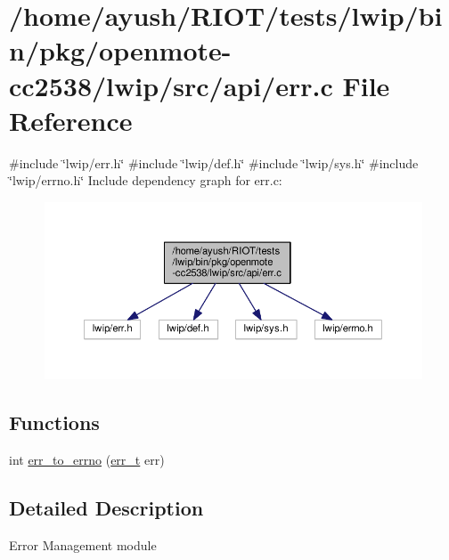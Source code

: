 \hypertarget{openmote-cc2538_2lwip_2src_2api_2err_8c}{}\section{/home/ayush/\+R\+I\+O\+T/tests/lwip/bin/pkg/openmote-\/cc2538/lwip/src/api/err.c File Reference}
\label{openmote-cc2538_2lwip_2src_2api_2err_8c}
{\ttfamily \#include \char`\"{}lwip/err.\+h\char`\"{}}\newline
{\ttfamily \#include \char`\"{}lwip/def.\+h\char`\"{}}\newline
{\ttfamily \#include \char`\"{}lwip/sys.\+h\char`\"{}}\newline
{\ttfamily \#include \char`\"{}lwip/errno.\+h\char`\"{}}\newline
Include dependency graph for err.\+c\+:
\nopagebreak
\begin{figure}[H]
\begin{center}
\leavevmode
\includegraphics[width=350pt]{openmote-cc2538_2lwip_2src_2api_2err_8c__incl}
\end{center}
\end{figure}
\subsection*{Functions}
\begin{DoxyCompactItemize}
\item 
int \hyperlink{openmote-cc2538_2lwip_2src_2api_2err_8c_af6382b3192357c2fb582c84c48bdda40}{err\+\_\+to\+\_\+errno} (\hyperlink{group__infrastructure__errors_gaf02d9da80fd66b4f986d2c53d7231ddb}{err\+\_\+t} err)
\end{DoxyCompactItemize}


\subsection{Detailed Description}
Error Management module 

